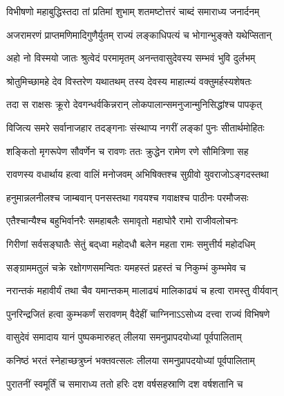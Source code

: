 \twolineshloka
{विभीषणो महाबुद्धिस्तदा तां प्रतिमां शुभाम्}
{शतमष्टोत्तरं चाब्दं समाराध्य जनार्दनम्} %

\twolineshloka
{अजरामरणं प्राप्तमणिमादिगुणैर्युतम्}
{राज्यं लङ्काधिपत्यं च भोगान्भुङ्क्ते यथेप्सितान्} %


\twolineshloka
{अहो नो विस्मयो जातः श्रुत्वेदं परमामृतम्}
{अनन्तवासुदेवस्य सम्भवं भुवि दुर्लभम्} %

\twolineshloka
{श्रोतुमिच्छामहे देव विस्तरेण यथातथम्}
{तस्य देवस्य माहात्म्यं वक्तुमर्हस्यशेषतः} %



\twolineshloka
{तदा स राक्षसः क्रूरो देवगन्धर्वकिन्नरान्}
{लोकपालान्समनुजान्मुनिसिद्धांश्च पापकृत्} %

\twolineshloka
{विजित्य समरे सर्वानाजहार तदङ्गनाः}
{संस्थाप्य नगरीं लङ्कां पुनः सीतार्थमोहितः} %

\twolineshloka
{शङ्कितो मृगरूपेण सौवर्णेन च रावणः}
{ततः क्रुद्धेन रामेण रणे सौमित्रिणा सह} %

\twolineshloka
{रावणस्य वधार्थाय हत्वा वालिं मनोजवम्}
{अभिषिक्तश्च सुग्रीवो युवराजोऽङ्गदस्तथा} %

\twolineshloka
{हनुमान्नलनीलश्च जाम्बवान् पनसस्तथा}
{गवयश्च गवाक्षश्च पाठीनः परमौजसः} %

\twolineshloka
{एतैश्चान्यैश्च बहुभिर्वानरैः समहाबलैः}
{समावृतो महाघोरै रामो राजीवलोचनः} %

\twolineshloka
{गिरीणां सर्वसङ्घातैः सेतुं बद्‌ध्वा महोदधौ}
{बलेन महता रामः समुत्तीर्य महोदधिम्} %

\twolineshloka
{सङ्ग्राममतुलं चक्रे रक्षोगणसमन्वितः}
{यमहस्तं प्रहस्तं च निकुम्भं कुम्भमेव च} %

\twolineshloka
{नरान्तकं महावीर्यं तथा चैव यमान्तकम्}
{मालाढ्यं मालिकाढ्यं च हत्वा रामस्तु वीर्यवान्} %

\twolineshloka
{पुनरिन्द्रजितं हत्वा कुम्भकर्णं सरावणम्}
{वैदेहीं चाग्निनाऽऽसोध्य दत्त्वा राज्यं विभिषणे} %

\twolineshloka
{वासुदेवं समादाय यानं पुष्पकमारुहत्}
{लीलया समनुप्रापदयोध्यां पूर्वपालिताम्} %

\twolineshloka
{कनिष्ठं भरतं स्नेहाच्छत्रुघ्नं भक्तवत्सलः}
{लीलया समनुप्रापदयोध्यां पूर्वपालिताम्} %

\twolineshloka
{पुरातनीं स्वमूर्तिं च समाराध्य ततो हरिः}
{दश वर्षसहस्राणि दश वर्षशतानि च} %


